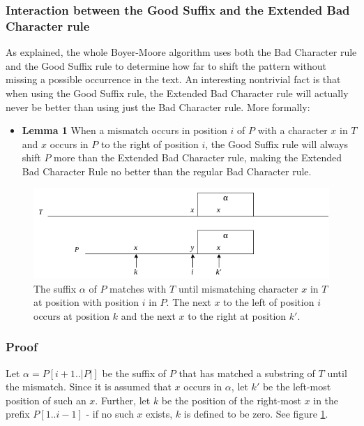 \subsubsection{Interaction between the Good Suffix and the Extended Bad Character rule}\label{sec:goodsuffixvsbadcharacter}

As explained, the whole Boyer-Moore algorithm uses both the Bad Character rule and the Good Suffix rule to determine how far to shift the pattern without missing a possible occurrence in the text. An interesting nontrivial fact is that when using the Good Suffix rule, the Extended Bad Character rule will actually never be better than using just the Bad Character rule. More formally:

\begin{itemize}
    \item[] \textbf{Lemma 1} When a mismatch occurs in position $i$ of $P$ with a character $x$ in $T$ and $x$ occurs in $P$ to the right of position $i$, the Good Suffix rule will always shift $P$ more than the Extended Bad Character rule, making the Extended Bad Character Rule no better than the regular Bad Character rule. 
\end{itemize}

\begin{figure}[t]
    \centering
    \includegraphics[width=\textwidth]{LaTeX/Figures/Zalg/suffixvsbadchar.png}
    \caption{The suffix $\alpha$ of $P$ matches with $T$ until mismatching character $x$ in $T$ at position with position $i$ in $P$. The next $x$ to the left of position $i$ occurs at position $k$ and the next $x$ to the right at position $k'$.}
    \label{fig:suffixvsbadchar}
\end{figure}

\subsubsection{Proof}

Let $\alpha=P[i+1..|P|]$ be the suffix of $P$ that has matched a substring of $T$ until the mismatch. Since it is assumed that $x$ occurs in $\alpha$, let $k'$ be the left-most position of such an $x$. Further, let $k$ be the position of the right-most $x$ in the prefix $P[1..i-1]$ - if no such $x$ exists, $k$ is defined to be zero. See figure \ref{fig:suffixvsbadchar}. 

